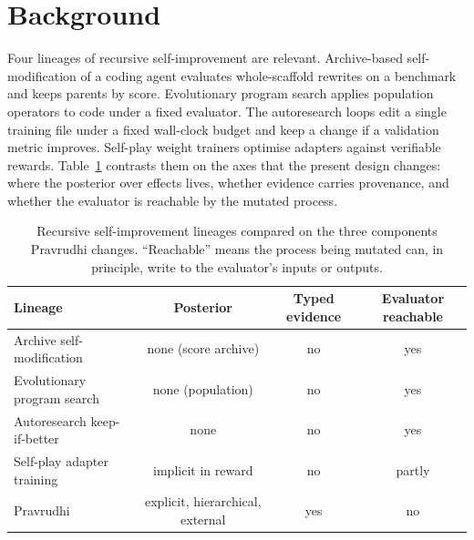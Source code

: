 \section{Background}
\label{sec:background}

Four lineages of recursive self-improvement are relevant. Archive-based self-modification of a coding agent evaluates whole-scaffold rewrites on a benchmark and keeps parents by score. Evolutionary program search applies population operators to code under a fixed evaluator. The autoresearch loops edit a single training file under a fixed wall-clock budget and keep a change if a validation metric improves. Self-play weight trainers optimise adapters against verifiable rewards. Table~\ref{tab:related} contrasts them on the axes that the present design changes: where the posterior over effects lives, whether evidence carries provenance, and whether the evaluator is reachable by the mutated process.

\begin{table}[t]
\centering
\caption{Recursive self-improvement lineages compared on the three components Pravrudhi changes. ``Reachable'' means the process being mutated can, in principle, write to the evaluator's inputs or outputs.}
\label{tab:related}
\begin{tabular}{lccc}
\toprule
\textbf{Lineage} & \textbf{Posterior} & \textbf{Typed evidence} & \textbf{Evaluator reachable} \\
\midrule
Archive self-modification & none (score archive) & no & yes \\
Evolutionary program search & none (population) & no & yes \\
Autoresearch keep-if-better & none & no & yes \\
Self-play adapter training & implicit in reward & no & partly \\
Pravrudhi & explicit, hierarchical, external & yes & no \\
\bottomrule
\end{tabular}
\end{table}
